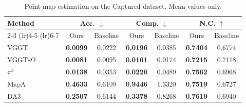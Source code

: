 \begin{table}[t]
\centering
\caption{Point map estimation on the Captured dataset. Mean values only.}
\label{tab:pointmap_captured_fullversion}
\scriptsize
\setlength{\tabcolsep}{5pt}
\begin{tabular}{l cc cc cc}
\toprule
\multirow{2}{*}{Method} & \multicolumn{2}{c}{Acc. $\downarrow$} & \multicolumn{2}{c}{Comp. $\downarrow$} & \multicolumn{2}{c}{N.C. $\uparrow$} \\
\cmidrule(lr){2-3} \cmidrule(lr){4-5} \cmidrule(lr){6-7}
 & Ours & Baseline & Ours & Baseline & Ours & Baseline \\
\midrule
VGGT            & \textbf{0.0099} & 0.0222 & \textbf{0.0196} & 0.0385 & \textbf{0.7404} & 0.6774 \\
VGGT-$\Omega$   & \textbf{0.0081} & 0.0095 & \textbf{0.0161} & 0.0174 & \textbf{0.7215} & 0.7118 \\
$\pi^3$         & \textbf{0.0138} & 0.0353 & \textbf{0.0220} & 0.0489 & \textbf{0.7562} & 0.6968 \\
MapA     & \textbf{0.4633} & 0.6109 & \textbf{0.9446} & 1.3320 & \textbf{0.7519} & 0.6727 \\
DA3  & \textbf{0.2507} & 0.6144 & \textbf{0.3378} & 0.8268 & \textbf{0.7619} & 0.6940 \\
\bottomrule
\end{tabular}
\end{table}